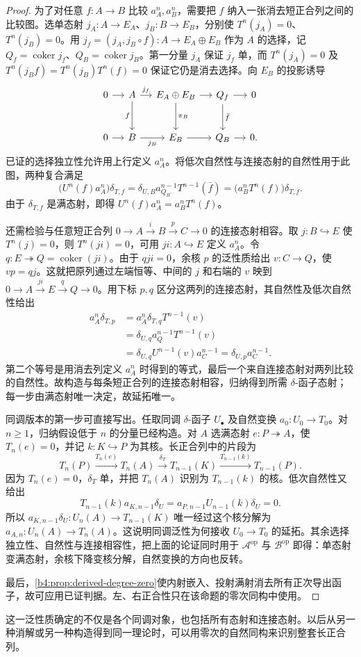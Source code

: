 \begin{proof}
	为了对任意 \(f:A\to B\) 比较 \(a_A^n,a_B^n\)，需要把 \(f\) 纳入一张消去短正合列之间的比较图。选单态射 \(j_A:A\to E_A\)、\(j_B:B\to E_B\)，分别使 \(T^n(j_A)=0\)、\(T^n(j_B)=0\)。用 \(j_f=(j_A,j_B\circ f):A\to E_A\oplus E_B\) 作为 \(A\) 的选择，记 \(Q_f=\operatorname{coker}j_f\)、\(Q_B=\operatorname{coker}j_B\)。第一分量 \(j_A\) 保证 \(j_f\) 单，而 \(T^n(j_A)=0\) 及 \(T^n(j_Bf)=T^n(j_B)T^n(f)=0\) 保证它仍是消去选择。向 \(E_B\) 的投影诱导
	\[
		\begin{tikzcd}[column sep=small,row sep=large]
			0\arrow[r]&A\arrow[r,"j_f"]\arrow[d,"f"'] &E_A\oplus E_B\arrow[r]\arrow[d,"\pi_B"] &Q_f\arrow[r]\arrow[d,"\bar f"]&0\\
			0\arrow[r]&B\arrow[r,"j_B"']&E_B\arrow[r]&Q_B\arrow[r]&0.
		\end{tikzcd}
	\]
	已证的选择独立性允许用上行定义 \(a_A^n\)。将低次自然性与连接态射的自然性用于此图，两种复合满足
	\[
		\bigl(U^n(f)a_A^n\bigr)\delta_{T,f} =\delta_{U,B}a_{Q_B}^{n-1}T^{n-1}(\bar f) =\bigl(a_B^nT^n(f)\bigr)\delta_{T,f}.
	\]
	由于 \(\delta_{T,f}\) 是满态射，即得 \(U^n(f)a_A^n=a_B^nT^n(f)\)。

	还需检验与任意短正合列 \(0\to A\xrightarrow{i}B\xrightarrow{p}C\to0\) 的连接态射相容。取 \(j:B\hookrightarrow E\) 使 \(T^n(j)=0\)，则 \(T^n(ji)=0\)，可用 \(ji:A\hookrightarrow E\) 定义 \(a_A^n\)。令 \(q:E\twoheadrightarrow Q=\operatorname{coker}(ji)\)。由于 \(qji=0\)，余核 \(p\) 的泛性质给出 \(v:C\to Q\)，使 \(vp=qj\)。这就把原列通过左端恒等、中间的 \(j\) 和右端的 \(v\) 映到 \(0\to A\xrightarrow{ji}E\xrightarrow{q}Q\to0\)。用下标 \(p,q\) 区分这两列的连接态射，其自然性及低次自然性给出
	\[
		\begin{aligned}
			a_A^n\delta_{T,p} &=a_A^n\delta_{T,q}T^{n-1}(v)\\
			&=\delta_{U,q}a_Q^{n-1}T^{n-1}(v)\\
			&=\delta_{U,q}U^{n-1}(v)a_C^{n-1} =\delta_{U,p}a_C^{n-1}.
		\end{aligned}
	\]
	第二个等号是用消去列定义 \(a_A^n\) 时得到的等式，最后一个来自连接态射对两列比较的自然性。故构造与每条短正合列的连接态射相容，归纳得到所需 \(\delta\)-函子态射；每一步由满态射唯一决定，故延拓唯一。

	同调版本的第一步可直接写出。任取同调 \(\delta\)-函子 \(U_\bullet\) 及自然变换 \(a_0:U_0\to T_0\)。对 \(n\ge1\)，归纳假设低于 \(n\) 的分量已经构造。对 \(A\) 选满态射 \(e:P\twoheadrightarrow A\)，使 \(T_n(e)=0\)，并记 \(k:K\hookrightarrow P\) 为其核。长正合列中的片段为
	\[
		T_n(P)\xrightarrow{T_n(e)}T_n(A) \xrightarrow{\delta_T}T_{n-1}(K)\xrightarrow{T_{n-1}(k)}T_{n-1}(P).
	\]
	因为 \(T_n(e)=0\)，\(\delta_T\) 单，并把 \(T_n(A)\) 识别为 \(T_{n-1}(k)\) 的核。低次自然性又给出
	\[
		T_{n-1}(k)a_{K,n-1}\delta_U =a_{P,n-1}U_{n-1}(k)\delta_U=0.
	\]
	所以 \(a_{K,n-1}\delta_U:U_n(A)\to T_{n-1}(K)\) 唯一经过这个核分解为 \(a_{A,n}:U_n(A)\to T_n(A)\)。这说明同调泛性为何接收 \(U_0\to T_0\) 的延拓。其余选择独立性、自然性与连接相容性，把上面的论证同时用于 \(\mathcal A^{\mathrm{op}}\) 与 \(\mathcal B^{\mathrm{op}}\) 即得：单态射变满态射，余核下降变核分解，自然变换的方向也反转。

	最后，\cref{b4:prop:derived-degree-zero}使内射嵌入、投射满射消去所有正次导出函子，故可应用已证判据。左、右正合性只在该命题的零次同构中使用。
\end{proof}

这一泛性质确定的不仅是各个同调对象，也包括所有态射和连接态射。以后从另一种消解或另一种构造得到同一理论时，可以用零次的自然同构来识别整套长正合列。

